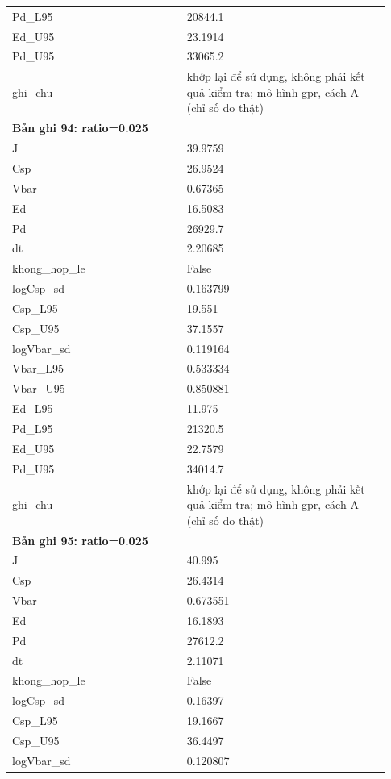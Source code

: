 \begin{longtable}{p{0.43\linewidth}p{0.50\linewidth}}
Pd\_\allowbreak L95 & 20844.1 \\
Ed\_\allowbreak U95 & 23.1914 \\
Pd\_\allowbreak U95 & 33065.2 \\
ghi\_\allowbreak chu & khớp lại để sử dụng, không phải kết quả kiểm tra; mô hình gpr, cách A (chỉ số đo thật) \\
\midrule
\multicolumn{2}{p{0.95\linewidth}}{\textbf{Bản ghi 94: ratio=0.025}} \\
J & 39.9759 \\
Csp & 26.9524 \\
Vbar & 0.67365 \\
Ed & 16.5083 \\
Pd & 26929.7 \\
dt & 2.20685 \\
khong\_\allowbreak hop\_\allowbreak le & False \\
logCsp\_\allowbreak sd & 0.163799 \\
Csp\_\allowbreak L95 & 19.551 \\
Csp\_\allowbreak U95 & 37.1557 \\
logVbar\_\allowbreak sd & 0.119164 \\
Vbar\_\allowbreak L95 & 0.533334 \\
Vbar\_\allowbreak U95 & 0.850881 \\
Ed\_\allowbreak L95 & 11.975 \\
Pd\_\allowbreak L95 & 21320.5 \\
Ed\_\allowbreak U95 & 22.7579 \\
Pd\_\allowbreak U95 & 34014.7 \\
ghi\_\allowbreak chu & khớp lại để sử dụng, không phải kết quả kiểm tra; mô hình gpr, cách A (chỉ số đo thật) \\
\midrule
\multicolumn{2}{p{0.95\linewidth}}{\textbf{Bản ghi 95: ratio=0.025}} \\
J & 40.995 \\
Csp & 26.4314 \\
Vbar & 0.673551 \\
Ed & 16.1893 \\
Pd & 27612.2 \\
dt & 2.11071 \\
khong\_\allowbreak hop\_\allowbreak le & False \\
logCsp\_\allowbreak sd & 0.16397 \\
Csp\_\allowbreak L95 & 19.1667 \\
Csp\_\allowbreak U95 & 36.4497 \\
logVbar\_\allowbreak sd & 0.120807 \\

\end{longtable}
